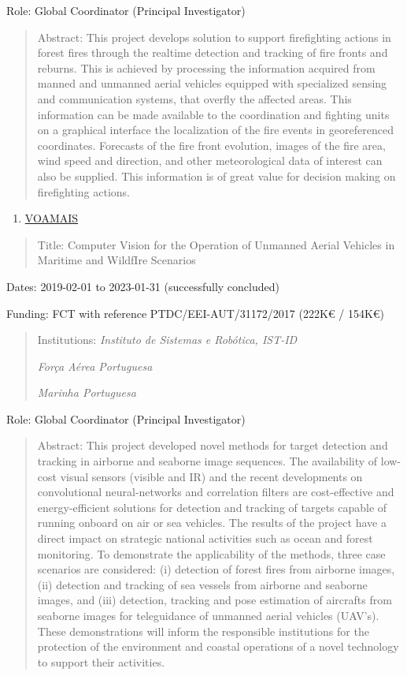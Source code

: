 Role: Global Coordinator (Principal Investigator)

\begin{quote}
Abstract: This project develops solution to support firefighting actions
in forest fires through the real­time detection and tracking of fire
fronts and re­burns. This is achieved by processing the information
acquired from manned and unmanned aerial vehicles equipped with
specialized sensing and communication systems, that overfly the affected
areas. This information can be made available to the coordination and
fighting units on a graphical interface the localization of the fire
events in georeferenced coordinates. Forecasts of the fire front
evolution, images of the fire area, wind speed and direction, and other
meteorological data of interest can also be supplied. This information
is of great value for decision making on firefighting actions.
\end{quote}

\begin{enumerate}
\def\labelenumi{\arabic{enumi}.}
\setcounter{enumi}{2}
\item
  \ul{VOAMAIS}
\end{enumerate}

\begin{quote}
Title: Computer Vision for the Operation of Unmanned Aerial Vehicles in
Maritime and WildfIre Scenarios
\end{quote}

Dates: 2019-02-01 to 2023-01-31 (successfully concluded)

Funding: FCT with reference PTDC/EEI-AUT/31172/2017 (222K€ / 154K€)

\begin{quote}
Institutions: \emph{Instituto de Sistemas e Robótica, IST-ID}

\emph{Força Aérea Portuguesa}

\emph{Marinha Portuguesa}
\end{quote}

Role: Global Coordinator (Principal Investigator)

\begin{quote}
Abstract: This project developed novel methods for target detection and
tracking in airborne and seaborne image sequences. The availability of
low-cost visual sensors (visible and IR) and the recent developments on
convolutional neural-networks and correlation filters are cost-effective
and energy-efficient solutions for detection and tracking of targets
capable of running onboard on air or sea vehicles. The results of the
project have a direct impact on strategic national activities such as
ocean and forest monitoring. To demonstrate the applicability of the
methods, three case scenarios are considered: (i) detection of forest
fires from airborne images, (ii) detection and tracking of sea vessels
from airborne and seaborne images, and (iii) detection, tracking and
pose estimation of aircrafts from seaborne images for teleguidance of
unmanned aerial vehicles (UAV's). These demonstrations will inform the
responsible institutions for the protection of the environment and
coastal operations of a novel technology to support their activities.
\end{quote}

